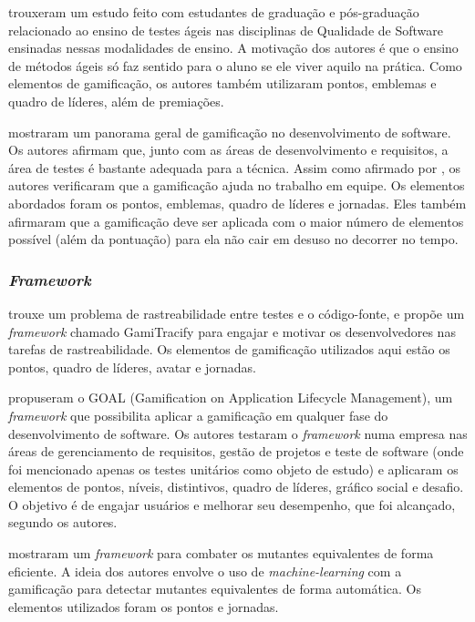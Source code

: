 \documentclass[twoside,english,brazilian]{UNISINOSartigo}
\begin{document}
\cite{Elgrably} trouxeram um estudo feito com estudantes de graduação e pós-graduação relacionado ao ensino de testes ágeis nas disciplinas de Qualidade de Software ensinadas nessas modalidades de ensino. A motivação dos autores é que o ensino de métodos ágeis só faz sentido para o aluno se ele viver aquilo na prática. Como elementos de gamificação, os autores também utilizaram pontos, emblemas e quadro de líderes, além de premiações. 

\cite{Pedreira} mostraram um panorama geral de gamificação no desenvolvimento de software. Os autores afirmam que, junto com as áreas de desenvolvimento e requisitos, a área de testes é bastante adequada para a técnica. Assim como afirmado por \cite{Fraser01}, os autores verificaram que a gamificação ajuda no trabalho em equipe. Os elementos abordados foram os pontos, emblemas, quadro de líderes e jornadas. Eles também afirmaram que a gamificação deve ser aplicada com o maior número de elementos possível (além da pontuação) para ela não cair em desuso no decorrer no tempo.

\subsubsection{\textit{Framework}}

\cite{Parizi} trouxe um problema de rastreabilidade entre testes e o código-fonte, e propõe um \textit{framework} chamado GamiTracify para engajar e motivar os desenvolvedores nas tarefas de rastreabilidade. Os elementos de gamificação utilizados aqui estão os pontos, quadro de líderes, avatar e jornadas.

\cite{Garcia} propuseram o GOAL (Gamification on Application Lifecycle Management), um \textit{framework} que possibilita aplicar a gamificação em qualquer fase do desenvolvimento de software. Os autores testaram o \textit{framework} numa empresa nas áreas de gerenciamento de requisitos, gestão de projetos e teste de software (onde foi mencionado apenas os testes unitários como objeto de estudo) e aplicaram os elementos de pontos, níveis, distintivos, quadro de líderes, gráfico social e desafio. O objetivo é de engajar usuários e melhorar seu desempenho, que foi alcançado, segundo os autores.

\cite{Houshmand} mostraram um \textit{framework} para combater os mutantes equivalentes de forma eficiente. A ideia dos autores envolve o uso de \textit{machine-learning} com a gamificação para detectar mutantes equivalentes de forma automática. Os elementos utilizados foram os pontos e jornadas.
\end{document}
